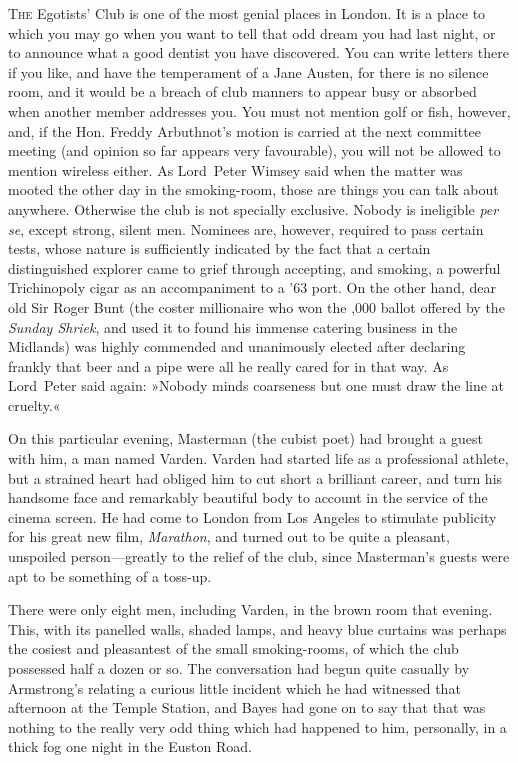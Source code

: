 
\lettrine[lines=4]{T}{he} Egotists' Club is one of the most genial places in London. It is a place to which you may go when you want to tell that odd dream you had last night, or to announce what a good dentist you have discovered. You can write letters there if you like, and have the temperament of a Jane Austen, for there is no silence room, and it would be a breach of club manners to appear busy or absorbed when another member addresses you. You must not mention golf or fish, however, and, if the Hon. Freddy Arbuthnot's motion is carried at the next committee meeting (and opinion so far appears very favourable), you will not be allowed to mention wireless either. As Lord~Peter Wimsey said when the matter was mooted the other day in the smoking-room, those are things you can talk about anywhere. Otherwise the club is not specially exclusive. Nobody is ineligible \textit{per se}, except strong, silent men. Nominees are, however, required to pass certain tests, whose nature is sufficiently indicated by the fact that a certain distinguished explorer came to grief through accepting, and smoking, a powerful Trichinopoly cigar as an accompaniment to a '63 port. On the other hand, dear old Sir Roger Bunt (the coster millionaire who won the ,000 ballot offered by the \textit{Sunday Shriek}, and used it to found his immense catering business in the Midlands) was highly commended and unanimously elected after declaring frankly that beer and a pipe were all he really cared for in that way. As Lord~Peter said again: »Nobody minds coarseness but one must draw the line at cruelty.«

On this particular evening, Masterman (the cubist poet) had brought a guest with him, a man named Varden. Varden had started life as a professional athlete, but a strained heart had obliged him to cut short a brilliant career, and turn his handsome face and remarkably beautiful body to account in the service of the cinema screen. He had come to London from Los Angeles to stimulate publicity for his great new film, \textit{Marathon}, and turned out to be quite a pleasant, unspoiled person—greatly to the relief of the club, since Masterman's guests were apt to be something of a toss-up.

There were only eight men, including Varden, in the brown room that evening. This, with its panelled walls, shaded lamps, and heavy blue curtains was perhaps the cosiest and pleasantest of the small smoking-rooms, of which the club possessed half a dozen or so. The conversation had begun quite casually by Armstrong's relating a curious little incident which he had witnessed that afternoon at the Temple Station, and Bayes had gone on to say that that was nothing to the really very odd thing which had happened to him, personally, in a thick fog one night in the Euston Road.

